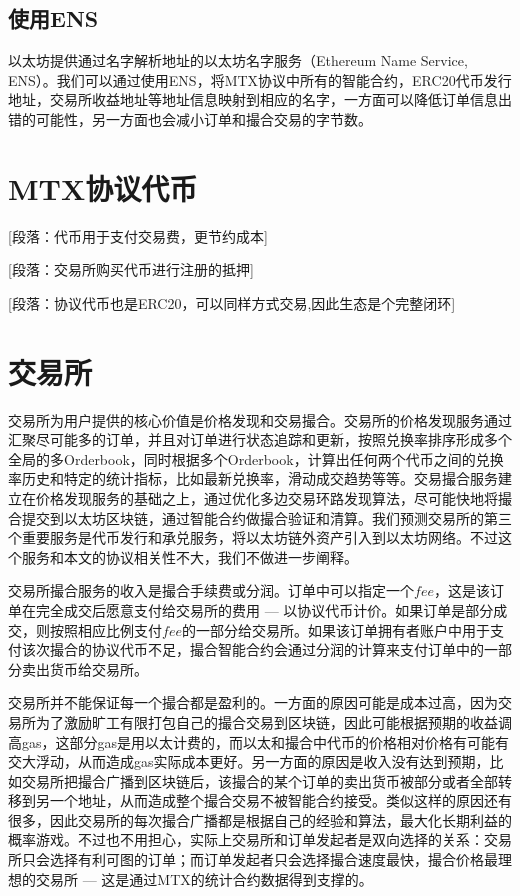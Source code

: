 \documentclass[UTF8,nofonts]{ctexart}
\begin{document}
\subsection{使用ENS\label{sec:registration}}

以太坊提供通过名字解析地址的以太坊名字服务（Ethereum Name Service, ENS）\cite{hirai2016formal}。我们可以通过使用ENS，将MTX协议中所有的智能合约，ERC20代币发行地址，交易所收益地址等地址信息映射到相应的名字，一方面可以降低订单信息出错的可能性，另一方面也会减小订单和撮合交易的字节数。


\section{MTX协议代币\label{sec:protocoltoken}}



[段落：代币用于支付交易费，更节约成本]

[段落：交易所购买代币进行注册的抵押]

[段落：协议代币也是ERC20，可以同样方式交易,因此生态是个完整闭环]


\section{交易所\label{sec:exchange}}

交易所为用户提供的核心价值是价格发现和交易撮合。交易所的价格发现服务通过汇聚尽可能多的订单，并且对订单进行状态追踪和更新，按照兑换率排序形成多个全局的多Orderbook，同时根据多个Orderbook，计算出任何两个代币之间的兑换率历史和特定的统计指标，比如最新兑换率，滑动成交趋势等等。交易撮合服务建立在价格发现服务的基础之上，通过优化多边交易环路发现算法，尽可能快地将撮合提交到以太坊区块链，通过智能合约做撮合验证和清算。我们预测交易所的第三个重要服务是代币发行和承兑服务，将以太坊链外资产引入到以太坊网络。不过这个服务和本文的协议相关性不大，我们不做进一步阐释。

交易所撮合服务的收入是撮合手续费或分润。订单中可以指定一个$fee$，这是该订单在完全成交后愿意支付给交易所的费用 --- 以协议代币计价。如果订单是部分成交，则按照相应比例支付$fee$的一部分给交易所。如果该订单拥有者账户中用于支付该次撮合的协议代币不足，撮合智能合约会通过分润的计算来支付订单中的一部分卖出货币给交易所。

交易所并不能保证每一个撮合都是盈利的。一方面的原因可能是成本过高，因为交易所为了激励旷工有限打包自己的撮合交易到区块链，因此可能根据预期的收益调高gas，这部分gas是用以太计费的，而以太和撮合中代币的价格相对价格有可能有交大浮动，从而造成gas实际成本更好。另一方面的原因是收入没有达到预期，比如交易所把撮合广播到区块链后，该撮合的某个订单的卖出货币被部分或者全部转移到另一个地址，从而造成整个撮合交易不被智能合约接受。类似这样的原因还有很多，因此交易所的每次撮合广播都是根据自己的经验和算法，最大化长期利益的概率游戏。不过也不用担心，实际上交易所和订单发起者是双向选择的关系：交易所只会选择有利可图的订单；而订单发起者只会选择撮合速度最快，撮合价格最理想的交易所 --- 这是通过MTX的统计合约数据得到支撑的。
\end{document}
